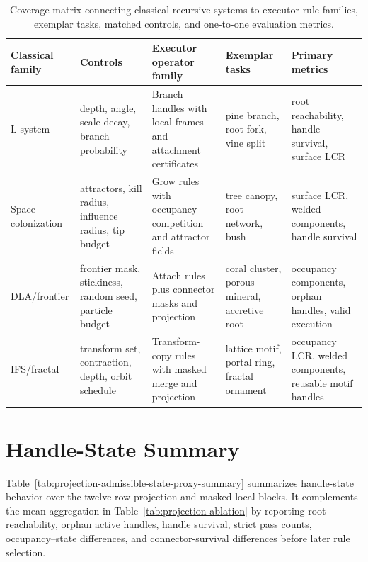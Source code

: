 \documentclass[acmtog,anonymous,review]{acmart}
\begin{document}
\begin{table}[t]
  \centering
  \caption{Coverage matrix connecting classical recursive systems to executor rule families, exemplar tasks, matched controls, and one-to-one evaluation metrics.}
  \label{tab:coverage-exemplar-tasks}
  \begin{tabular}{@{}p{}p{}p{}p{}p{}@{}}
    \toprule
    Classical family & Controls & Executor operator family & Exemplar tasks & Primary metrics \\
    \midrule
    L-system & depth, angle, scale decay, branch probability & Branch handles with local frames and attachment certificates & pine branch, root fork, vine split & root reachability, handle survival, surface LCR \\
    Space colonization & attractors, kill radius, influence radius, tip budget & Grow rules with occupancy competition and attractor fields & tree canopy, root network, bush & surface LCR, welded components, handle survival \\
    DLA/frontier & frontier mask, stickiness, random seed, particle budget & Attach rules plus connector masks and projection & coral cluster, porous mineral, accretive root & occupancy components, orphan handles, valid execution \\
    IFS/fractal & transform set, contraction, depth, orbit schedule & Transform-copy rules with masked merge and projection & lattice motif, portal ring, fractal ornament & occupancy LCR, welded components, reusable motif handles \\
    \bottomrule
  \end{tabular}
\end{table}


\section{Handle-State Summary}
\label{app:state-proxy-audit}
Table~\ref{tab:projection-admissible-state-proxy-summary} summarizes handle-state behavior over the twelve-row projection and masked-local blocks. It complements the mean aggregation in Table~\ref{tab:projection-ablation} by reporting root reachability, orphan active handles, handle survival, strict pass counts, occupancy--state differences, and connector-survival differences before later rule selection.

\begin{table}[t]
  \centering
  \small
  \setlength{\tabcolsep}{4pt}
  \caption{Handle-state summary for projection and masked-local variants, reporting strict-pass counts, occupancy--state differences, and connector-survival differences across the twelve-row blocks.}
  \label{tab:projection-admissible-state-proxy-summary}
  \resizebox{\textwidth}{!}{%
  
  }
\end{table}
\end{document}

